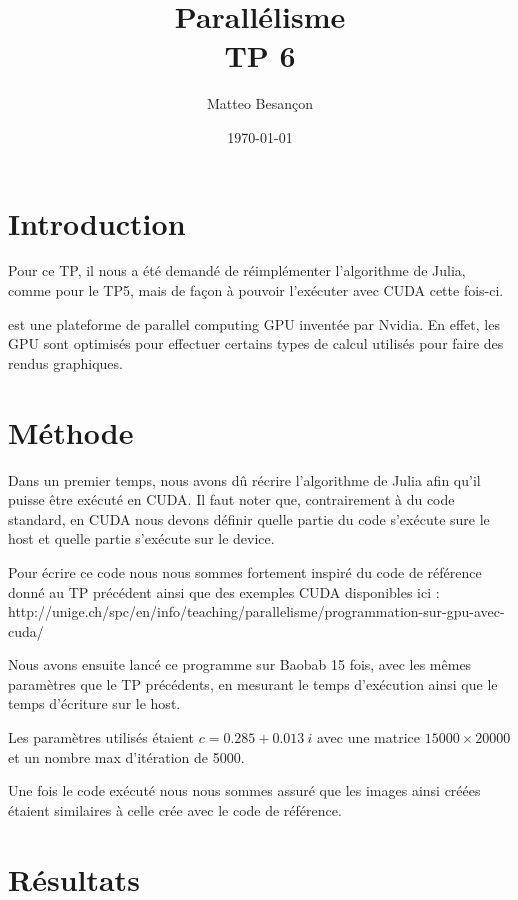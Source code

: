 \documentclass[12pt,a4paper,oneside, titlepage]{report}
\author{Matteo Besançon}
\title {Parallélisme \\ \large TP 6}
\date{\today}
\begin{document}
	\maketitle
	\newpage

	\section*{Introduction}
	Pour ce TP, il nous a été demandé de réimplémenter l'algorithme de Julia, comme pour le TP5, mais de façon à pouvoir l'exécuter avec CUDA cette fois-ci.

 est une plateforme de parallel computing GPU inventée par Nvidia. En effet, les GPU sont optimisés pour effectuer certains types de calcul utilisés pour faire des rendus graphiques.

	\section*{Méthode}

	Dans un premier temps, nous avons dû récrire l'algorithme de Julia afin qu'il puisse être exécuté en CUDA. Il faut noter que, contrairement à du code standard, en CUDA nous devons définir quelle partie du code s'exécute sure le host et quelle partie s'exécute sur le device.

	Pour écrire ce code nous nous sommes fortement inspiré du code de référence donné au TP précédent ainsi que des exemples CUDA disponibles ici : http://unige.ch/spc/en/info/teaching/parallelisme/programmation-sur-gpu-avec-cuda/

	Nous avons ensuite lancé ce programme sur Baobab 15 fois, avec les mêmes paramètres que le TP précédents, en mesurant le temps d'exécution ainsi que le temps d'écriture sur le host.

	Les paramètres utilisés étaient $c = 0.285 + 0.013\ i$ avec une matrice $15000 \times 20000$ et un nombre max d'itération de 5000.

	Une fois le code exécuté nous nous sommes assuré que les images ainsi créées étaient similaires à celle crée avec le code de référence.
	\section*{Résultats}
\end{document}

